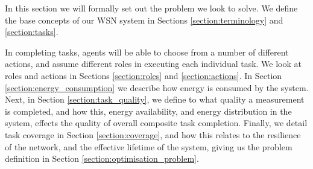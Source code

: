 
In this section we will formally set out the problem we look to solve. We define the base concepts of our WSN system in Sections \ref{section:terminology} and \ref{section:tasks}. 

In completing tasks, agents will be able to choose from a number of different actions, and assume different roles in executing each individual task. We look at roles and actions in Sections \ref{section:roles} and \ref{section:actions}. In Section \ref{section:energy_consumption} we describe how energy is consumed by the system. Next, in Section \ref{section:task_quality}, we define to what quality a measurement is completed, and how this, energy availability, and energy distribution in the system, effects the quality of overall composite task completion. Finally, we detail task coverage in Section \ref{section:coverage}, and how this relates to the resilience of the network, and the effective lifetime of the system, giving us the problem definition in Section \ref{section:optimisation_problem}.

